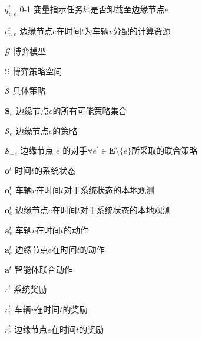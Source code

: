 \begin{denotation}[0mm][15mm]
	\item[$q_{v, e}^t$] 0-1 变量指示任务$k_v^t$是否卸载至边缘节点$e$
	\item[$c_{v, e}^t$] 边缘节点$e$在时间$t$为车辆$v$分配的计算资源
	\item[$\mathcal{G}$] 博弈模型
	\item[$\mathbb{S}$] 博弈策略空间
	\item[$\mathcal{S}$] 具体策略
	\item[$\mathbf{S}_{e}$] 边缘节点$e$的所有可能策略集合
	\item[$\mathcal{S}_{e}$] 边缘节点$e$的策略
	\item[$\mathcal{S}_{-e}$] 边缘节点 $e$ 的对手$\forall e^{\prime} \in \mathbf{E} \setminus \{e\}$所采取的联合策略
	\item[$\boldsymbol{o}^{t}$] 时间$t$的系统状态
	\item[$\boldsymbol{o}_{v}^{t}$] 车辆$v$在时间$t$对于系统状态的本地观测
	\item[$\boldsymbol{o}_{e}^{t}$] 边缘节点$e$在时间$t$对于系统状态的本地观测
	\item[$\boldsymbol{a}_{v}^{t}$] 车辆$v$在时间$t$的动作
	\item[$\boldsymbol{a}_{e}^{t}$] 边缘节点$e$在时间$t$的动作
	\item[$\boldsymbol{a}^{t}$] 智能体联合动作
	\item[$r^{t}$] 系统奖励
	\item[$r_{v}^{t}$] 车辆$v$在时间$t$的奖励
	\item[$r_{e}^{t}$] 边缘节点$e$在时间$t$的奖励
\end{denotation}

\endinput
